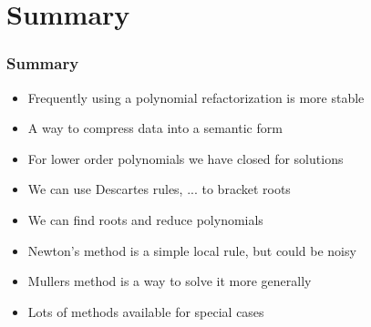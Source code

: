 \documentclass[10pt]{beamer}
\begin{document}
\section{Summary}

\begin{frame}
  \frametitle{Summary}
  \begin{itemize}
  \item Frequently using a polynomial refactorization is more stable
  \item A way to compress data into a semantic form
  \item For lower order polynomials we have closed for solutions
  \item We can use Descartes rules, ... to bracket roots
  \item We can find roots and reduce polynomials
  \item Newton's method is a simple local rule, but could be noisy
  \item Mullers method is a way to solve it more generally 
  \item Lots of methods available for special cases
  \end{itemize}
\end{frame}
\end{document}
